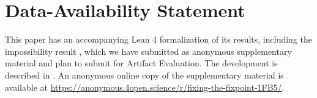 \section*{Data-Availability Statement}
This paper has an accompanying Lean 4 formalization of its results, including the impossibility result , which we have submitted as anonymous supplementary material and plan to submit for Artifact Evaluation. The development is described in . An anonymous online copy of the supplementary material is available at \url{https://anonymous.4open.science/r/fixing-the-fixpoint-1FB5/}.